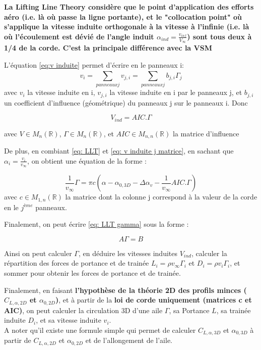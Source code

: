 \textbf{La Lifting Line Theory considère que le point d'application des efforts aéro (i.e. là où passe la ligne portante), et le "collocation point" où s'applique la vitesse induite orthogonale à la vitesse à l'infinie (i.e. là où l'écoulement est dévié de l'angle induit $\alpha_{ind} = \frac{v_{inf}}{V_{\infty}}$) sont tous deux à 1/4 de la corde. C'est la principale différence avec la VSM}

L'équation \ref{eq:v induite} permet d'écrire en le panneaux i:
\begin{equation}
    v_i = \sum_{panneaux j}^{} v_{j,i} = \sum_{panneaux j}^{} b_{j,i} \Gamma_j
    \label{eq: v induite j}
\end{equation}
avec $v_i$ la vitesse induite en i, $v_{j,i}$ la vitesse induite en i par le panneaux j, et $b_{j,i}$ un coefficient d'influence (géométrique) du panneaux j sur le panneaux i. Donc 

\begin{equation}
    V_{ind} = AIC .\Gamma
    \label{eq: v induite j matrice}
\end{equation}

avec $V \in M_n(\mathbb{R})$, $\Gamma \in M_n(\mathbb{R})$, et $AIC \in M_{n,n}(\mathbb{R})$ la matrice d'influence

De plus, en combiant \ref{eq: LLT} et \ref{eq: v induite j matrice}, en sachant que $\alpha_i = \frac{v_i}{v_{\infty}}$, on obtient une équation de la forme : 

\begin{equation}
    \frac{1}{v_{\infty}}\Gamma = \pi c (\alpha-\alpha_{0,3D} - \Delta\alpha_v - \frac{1}{v_{\infty}} AIC.\Gamma)
    \label{eq: LLT gamma}
\end{equation}
avec $c \in M_{1,n}(\mathbb{R})$ la matrice dont la colonne j correspond à la valeur de la corde en le $j^{ème}$ panneaux.

Finalement, on peut écrire \ref{eq: LLT gamma} sous la forme :

\begin{equation}
    A \Gamma = B
    \label{eq: LLT gamma 2 }
\end{equation}

Ainsi on peut calculer $\Gamma$, en déduire les vitesses induites $V_{ind}$, calculer la répartition des forces de portance et de trainée $L_i = \rho v_{\infty} \Gamma_i$ et $D_i = \rho v_i \Gamma_i$, et sommer pour obtenir les forces de portance et de trainée.

Finalement, en faisant \textbf{l’hypothèse de la théorie 2D des profils minces ($C_{L, \alpha, 2D}$ et $\alpha_{0, 2D}$)}, et à partir de la \textbf{loi de corde uniquement (matrices c et AIC)}, on peut calculer la circulation 3D d’une aile $\Gamma$, sa Portance $L$, sa trainée induite $D_i$, et sa vitesse induite $v_i$. \\
A noter qu'il existe une formule simple qui permet de calculer $C_{L, \alpha, 3D}$ et $\alpha_{0, 3D}$ à partir de $C_{L, \alpha, 2D}$ et $\alpha_{0, 2D}$ et de l'allongement de l'aile.

